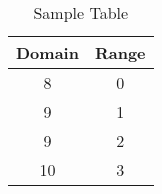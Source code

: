 \documentclass{article}
\begin{document}
\begin{table}[h]
\centering
\begin{tabular}{c c}
\hline \hline
Domain & Range \\
\hline
8 & 0 \\
9 & 1 \\
9 & 2 \\
10 & 3 \\
\hline \hline
\end{tabular}
\caption{Sample Table}
\label{tab:sample_table}
\end{table}
\end{document}
